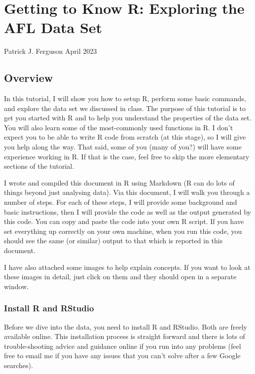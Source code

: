 \documentclass[
]{article}
\author{}
\date{\vspace{-2.5em}}
\begin{document}
\hypertarget{getting-to-know-r-exploring-the-afl-data-set}{%
\section{Getting to Know R: Exploring the AFL Data
Set}\label{getting-to-know-r-exploring-the-afl-data-set}}

Patrick J. Ferguson April 2023

\hypertarget{overview}{%
\subsection{Overview}\label{overview}}

In this tutorial, I will show you how to setup R, perform some basic
commands, and explore the data set we discussed in class. The purpose of
this tutorial is to get you started with R and to help you understand
the properties of the data set. You will also learn some of the
most-commonly used functions in R. I don't expect you to be able to
write R code from scratch (at this stage), so I will give you help along
the way. That said, some of you (many of you?) will have some experience
working in R. If that is the case, feel free to skip the more elementary
sections of the tutorial.

I wrote and compiled this document in R using Markdown (R can do lots of
things beyond just analysing data). Via this document, I will walk you
through a number of steps. For each of these steps, I will provide some
background and basic instructions, then I will provide the code as well
as the output generated by this code. You can copy and paste the code
into your own R script. If you have set everything up correctly on your
own machine, when you run this code, you should see the same (or
similar) output to that which is reported in this document.

I have also attached some images to help explain concepts. If you want
to look at these images in detail, just click on them and they should
open in a separate window.

\hypertarget{install-r-and-rstudio}{%
\subsubsection{Install R and RStudio}\label{install-r-and-rstudio}}

Before we dive into the data, you need to install R and RStudio. Both
are freely available online. This installation process is straight
forward and there is lots of trouble-shooting advice and guidance online
if you run into any problems (feel free to email me if you have any
issues that you can't solve after a few Google searches).
\end{document}
